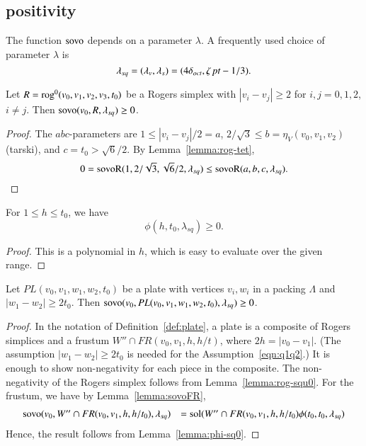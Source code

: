 \subsection{positivity}%
    \label{sec:pos}

The function ${\operatorname{sovo}}$ depends on a parameter $\lambda$.
A frequently used choice of parameter $\lambda$ is
$$
 \lambda_{sq} =(\lambda_v,\lambda_s)=(4\delta_{oct},\zeta\,\hbox{\it pt}-1/3).
$$


\begin{lemma}\label{lemma:rog-squ0}
Let $R={\operatorname{rog}}^0(v_0,v_1,v_2,v_3,t_0)$ be a Rogers simplex
with $|v_i-v_j|\ge 2$ for $i,j=0,1,2$, $i\ne j$.
Then ${\operatorname{sovo}}(v_0,R,\lambda_{sq})\ge 0$.
\end{lemma}

\begin{proof}
The $abc$-parameters are $1 \le |v_i-v_j|/2 = a$,
$2/\sqrt{3}\le b = \eta_V(v_0,v_1,v_2)$ (tarski),
and $c = t_0 > \sqrt6/2$.  By Lemma~\ref{lemma:rog-tet},
$$
0 = {\operatorname{sovoR}}(1,2/\sqrt{3},\sqrt{6}/2,\lambda_{sq}) 
   \le {\operatorname{sovoR}}(a,b,c,\lambda_{sq}).
$$
\end{proof}



\begin{lemma}\label{lemma:phi-sq0}
For $1\le h\le t_0$, we have
$$
\phi(h,t_0,\lambda_{sq})\ge 0.
$$
\end{lemma}

\begin{proof}
This is a polynomial in $h$, which is easy to evaluate over the
given range.
\end{proof}


\begin{lemma}\label{lemma:pl-sq0}
Let $PL(v_0,v_1,w_1,w_2,t_0)$ be a plate with
vertices $v_i,w_i$ in a packing $\Lambda$ and $|w_1-w_2|\ge 2 t_0$.
Then
${\operatorname{sovo}}(v_0,PL(v_0,v_1,w_1,w_2,t_0),\lambda_{sq}) \ge 0$. 
\end{lemma}

\begin{proof} In the notation of Definition~\ref{def:plate},
a plate is a composite of Rogers simplices and
a frustum $W''\cap FR(v_0,v_1,h,h/t)$,
where $2h = |v_0-v_1|$.  (The assumption $|w_1-w_2|\ge 2 t_0$
is needed for the Assumption~\ref{eqn:q1q2}.)
It is enough to show non-negativity for each piece in the composite.
The non-negativity of the Rogers simplex follows from Lemma~\ref{lemma:rog-squ0}.
For the frustum, we have by Lemma~\ref{lemma:sovoFR},
$$
\begin{array}{lll}
{\operatorname{sovo}}(v_0,W''\cap FR(v_0,v_1,h,h/t_0),\lambda_{sq}) &=
  \operatorname{sol}(W''\cap FR(v_0,v_1,h,h/t_0) \phi(t_0,t_0,\lambda_{sq})\\
\end{array}
$$
Hence, the result follows from Lemma~\ref{lemma:phi-sq0}.
\end{proof}


